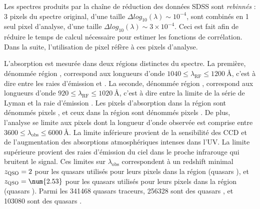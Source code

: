 Les spectres produits par la chaîne de réduction des données SDSS sont \emph{rebinnés} : 3 pixels du spectre original, d'une taille $\Delta log_{10}(\lambda) \sim 10^{-4}$, sont combinés en 1 seul pixel d'analyse, d'une taille $\Delta log_{10}(\lambda) \sim 3 \times 10^{-4}$. Ceci est fait afin de réduire le temps de calcul nécessaire pour estimer les fonctions de corrélation. Dans la suite, l'utilisation de \og pixel \fg réfère à ces pixels d'analyse.

L'absorption \lya{} est mesurée dans deux régions distinctes du spectre. La première, dénommée région \lya{}, correspond aux longueurs d'onde $\num{1040} \leq \lambda_{\mathrm{RF}} \leq \SI{1200}{\angstrom}$, c'est à dire entre les raies d'émission \lyb{} et \lya{}. La seconde, dénommée région \lyb{}, correspond aux longueurs d'onde $\num{920} \leq \lambda_{\mathrm{RF}} \leq \SI{1020}{\angstrom}$, c'est à dire entre la limite de la série de Lyman et la raie d'émission \lyb{}. Les pixels d'absorption \lya{} dans la région \lya{} sont dénommés pixels \lyalya{}, et ceux dans la région \lyb{} sont dénommés pixels \lyalyb{}.
De plus, l'analyse se limite aux pixels dont la longueur d'onde observée est comprise entre $\num{3600} \leq \lambda_{\mathrm{obs}} \leq \SI{6000}{\angstrom}$.
La limite inférieure provient de la sensibilité des CCD et de l'augmentation des absorptions atmosphériques intenses dans l'UV. La limite supérieure provient des raies d'émission du ciel dans le proche infrarouge qui bruitent le signal.
Ces limites sur $\lambda_{\mathrm{obs}}$ correspondent à un redshift minimal $z_{\textsc{QSO}} = 2$ pour les quasars utilisés pour leurs pixels dans la région \lya{} (quasars \lya{}), et $z_{\textsc{QSO}} = \num{2.53}$ pour les quasars utilisés pour leurs pixels dans la région \lyb{} (quasars \lyb{}). Parmi les \num{341468} quasars traceurs, \num{256328} sont des quasars \lya{}, et \num{103080} sont des quasars \lyb{}.

